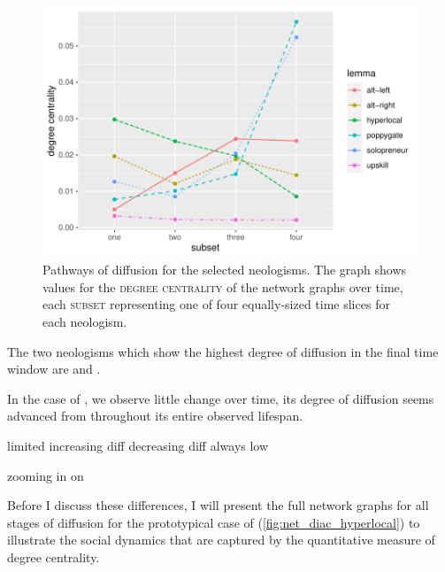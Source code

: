 \documentclass[
  a4paper,
  abstract=on,
  captions=tableabove
  ]{scrartcl}
\begin{document}
      \begin{figure}
        \caption[Centralization over time for the selected neologisms]{Pathways of diffusion for the selected neologisms. The graph shows values for the \textsc{degree centrality} of the network graphs over time, each \textsc{subset} representing one of four equally-sized time slices for each neologism.}
        \label{fig:cent_diac_cases}
        \centering
        \includegraphics[width=\linewidth, height=.8\textheight, keepaspectratio]{img/cases_cent_diac.pdf}
      \end{figure}

      The two neologisms which show the highest degree of diffusion in the final time window are  and .

        In the case of , we observe little change over time, its degree of diffusion seems advanced from throughout its entire observed lifespan.

      limited
      increasing diff
      decreasing diff
      always low




      zooming in on 

      Before I discuss these differences, I will present the full network graphs for all stages of diffusion for the prototypical case of  (\ref{fig:net_diac_hyperlocal}) to illustrate the social dynamics that are captured by the quantitative measure of degree centrality.
\end{document}
